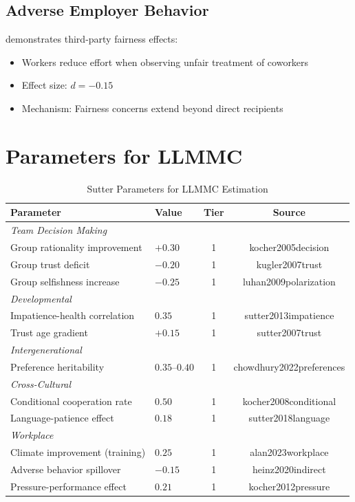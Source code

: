 \subsection{Adverse Employer Behavior}

\citet{heinz2020indirect} demonstrates third-party fairness effects:
\begin{itemize}
\item Workers reduce effort when observing unfair treatment of coworkers
\item Effect size: $d = -0.15$
\item Mechanism: Fairness concerns extend beyond direct recipients
\end{itemize}


\section{Parameters for LLMMC}
\label{sec:su-parameters}

\begin{table}[htbp]
\centering
\caption{Sutter Parameters for LLMMC Estimation}
\label{tab:su-parameters}
\renewcommand{\arraystretch}{1.3}
\begin{tabular}{@{}llcc@{}}
\toprule
\textbf{Parameter} & \textbf{Value} & \textbf{Tier} & \textbf{Source} \\
\midrule
\multicolumn{4}{l}{\textit{Team Decision Making}} \\
Group rationality improvement & $+0.30$ & 1 & kocher2005decision \\
Group trust deficit & $-0.20$ & 1 & kugler2007trust \\
Group selfishness increase & $-0.25$ & 1 & luhan2009polarization \\
\midrule
\multicolumn{4}{l}{\textit{Developmental}} \\
Impatience-health correlation & $0.35$ & 1 & sutter2013impatience \\
Trust age gradient & $+0.15$ & 1 & sutter2007trust \\
\midrule
\multicolumn{4}{l}{\textit{Intergenerational}} \\
Preference heritability & $0.35$--$0.40$ & 1 & chowdhury2022preferences \\
\midrule
\multicolumn{4}{l}{\textit{Cross-Cultural}} \\
Conditional cooperation rate & $0.50$ & 1 & kocher2008conditional \\
Language-patience effect & $0.18$ & 1 & sutter2018language \\
\midrule
\multicolumn{4}{l}{\textit{Workplace}} \\
Climate improvement (training) & $0.25$ & 1 & alan2023workplace \\
Adverse behavior spillover & $-0.15$ & 1 & heinz2020indirect \\
Pressure-performance effect & $0.21$ & 1 & kocher2012pressure \\
\bottomrule
\end{tabular}
\end{table}


